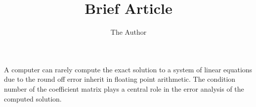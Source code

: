 \documentclass[11pt]{amsart}
\title{Brief Article}
\author{The Author}
\begin{document}
\maketitle


A computer can rarely compute the exact solution to a system of linear equations due to the round off error inherit in floating point arithmetic.
The condition number of the coefficient matrix plays a central role in the error analysis of the computed solution.
\end{document}
